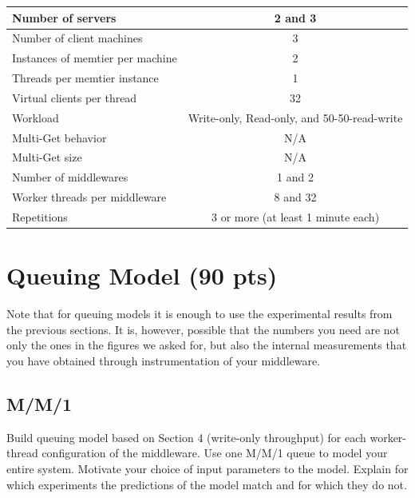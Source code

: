 \documentclass[11pt,a4paper]{article}
\begin{document}
\begin{center}
	\scriptsize{
		\begin{tabular}{|l|c|}
			\hline Number of servers                & 2 and 3                                     \\
			\hline Number of client machines        & 3                                           \\
			\hline Instances of memtier per machine & 2                                           \\
			\hline Threads per memtier instance     & 1                                           \\
			\hline Virtual clients per thread       & 32                                     \\
			\hline Workload                         & Write-only, Read-only, and 50-50-read-write \\
			\hline Multi-Get behavior               & N/A                                         \\
			\hline Multi-Get size                   & N/A                                         \\
			\hline Number of middlewares            & 1 and 2                                     \\
			\hline Worker threads per middleware    & 8 and 32                                    \\
			\hline Repetitions                      & 3 or more (at least 1 minute each)                                   \\
			\hline
		\end{tabular}
	}
\end{center}

\section{Queuing Model (90 pts)}

Note that for queuing models it is enough to use the experimental results from the previous sections. It is, however, possible that the numbers you need are not only the ones in the figures we asked for, but also the internal measurements that you have obtained through instrumentation of your middleware.

\subsection{M/M/1}

Build queuing model based on Section 4 (write-only throughput) for each worker-thread configuration of the middleware. Use one M/M/1 queue to model your entire system. Motivate your choice of input parameters to the model. Explain for which experiments the predictions of the model match and for which they do not.
\end{document}

